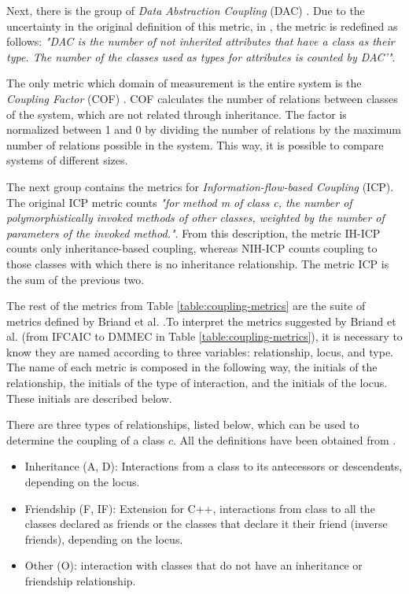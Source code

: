 Next, there is the group of \textit{Data Abstraction Coupling} (DAC) \cite{li1993object}. Due to the uncertainty in the original definition of this metric, in \cite{briand1999unified}, the metric is redefined as follows: \textit{"DAC is the number of not inherited attributes that have a class as their type. The number of the classes used as types for attributes is counted by DAC'"}.

The only metric which domain of measurement is the entire system is the \textit{Coupling Factor} (COF) \cite{abreu1995toward}. COF calculates the number of relations between classes of the system, which are not related through inheritance. The factor is normalized between 1 and 0 by dividing the number of relations by the maximum number of relations possible in the system. This way, it is possible to compare systems of different sizes.

The next group contains the metrics for \textit{Information-flow-based Coupling} (ICP). The original ICP metric counts \textit{"for method m of class c, the number of polymorphistically invoked methods of other classes, weighted by the number of parameters of the invoked method."}. From this description, the metric IH-ICP counts only inheritance-based coupling, whereas NIH-ICP counts coupling to those classes with which there is no inheritance relationship. The metric ICP is the sum of the previous two.

The rest of the metrics from Table \ref{table:coupling-metrics} are the suite of metrics defined by Briand et al. \cite{briand1997investigation}.To interpret the metrics suggested by Briand et al. \cite{briand1997investigation}  (from IFCAIC to DMMEC in Table \ref{table:coupling-metrics}), it is necessary to know they are named according to three variables: relationship, locus, and type. The name of each metric is composed in the following way, the initials of the relationship, the initials of the type of interaction, and the initials of the locus. These initials are described below.

\bigskip\noindent
There are three types of relationships, listed below, which can be used to determine the coupling of a class $c$. All the definitions have been obtained from \cite{briand1997investigation}.

\begin{itemize}
  \item Inheritance (A, D): Interactions from a class to its antecessors or descendents, depending on the locus.
  \item Friendship (F, IF): Extension for C++, interactions from class to all the  classes declared as friends or the classes that declare it their friend (inverse friends), depending on the locus.
  \item Other (O): interaction with classes that do not have an inheritance or friendship relationship.
\end{itemize}

